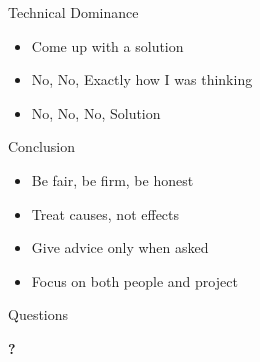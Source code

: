 \documentclass{beamer}
\begin{document}
\begin{frame}{Technical Dominance}
\begin{itemize}
\item Come up with a solution
\item No, No, Exactly how I was thinking
\item No, No, No, Solution
\end{itemize}
\end{frame}

\begin{frame}{Conclusion}
\begin{itemize}
\item Be fair, be firm, be honest
\item Treat causes, not effects
\item Give advice only when asked
\item Focus on both people and project
\end{itemize}
\end{frame}

\begin{frame}{Questions}
  \begin{center}
    \bfseries
    \Huge
    ?
  \end{center}
\end{frame}
\end{document}
